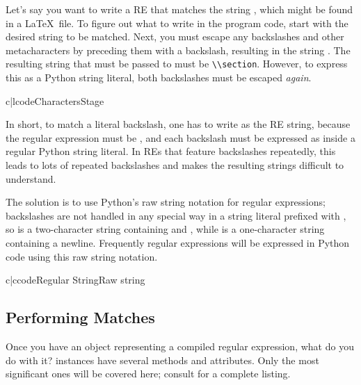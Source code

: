 \documentclass{howto}
\begin{document}
Let's say you want to write a RE that matches the string
, which might be found in a \LaTeX\ file.  To figure
out what to write in the program code, start with the desired string
to be matched.  Next, you must escape any backslashes and other
metacharacters by preceding them with a backslash, resulting in the
string .  The resulting string that must be passed
to  must be \verb|\\section|.  However, to
express this as a Python string literal, both backslashes must be
escaped \emph{again}.

\begin{tableii}{c|l}{code}{Characters}{Stage}
\end{tableii}

In short, to match a literal backslash, one has to write
 as the RE string, because the regular expression
must be \samp{\e\e}, and each backslash must be expressed as
\samp{\e\e} inside a regular Python string literal.  In REs that
feature backslashes repeatedly, this leads to lots of repeated
backslashes and makes the resulting strings difficult to understand.

The solution is to use Python's raw string notation for regular
expressions; backslashes are not handled in any special way in
a string literal prefixed with , so  is a
two-character string containing \character{\e} and ,
while  is a one-character string containing a newline.
Frequently regular expressions will be expressed in Python
code using this raw string notation.  

\begin{tableii}{c|c}{code}{Regular String}{Raw string}
\end{tableii}

\subsection{Performing Matches}

Once you have an object representing a compiled regular expression,
what do you do with it?   instances have several
methods and attributes.  Only the most significant ones will be
covered here; consult  for a
complete listing.
\end{document}
